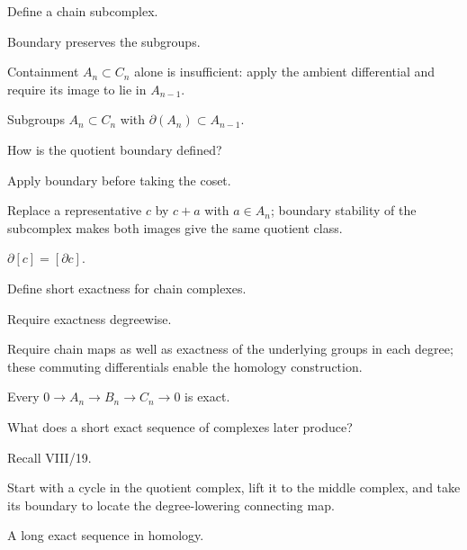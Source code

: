\begin{exercise}\label{exr:viii16-16}
Define a chain subcomplex.
\end{exercise}
\begin{hint}
Boundary preserves the subgroups.

Containment \(A_n\subset C_n\) alone is insufficient: apply the ambient differential and require its image to lie in \(A_{n-1}\).
\end{hint}
\begin{solution}
Subgroups \(A_n\subset C_n\) with \(\partial(A_n)\subset A_{n-1}\).
\end{solution}

\begin{exercise}\label{exr:viii16-17}
How is the quotient boundary defined?
\end{exercise}
\begin{hint}
Apply boundary before taking the coset.

Replace a representative \(c\) by \(c+a\) with \(a\in A_n\); boundary stability of the subcomplex makes both images give the same quotient class.
\end{hint}
\begin{solution}
\(\partial[c]=[\partial c]\).
\end{solution}

\begin{exercise}\label{exr:viii16-18}
Define short exactness for chain complexes.
\end{exercise}
\begin{hint}
Require exactness degreewise.

Require chain maps as well as exactness of the underlying groups in each degree; these commuting differentials enable the homology construction.
\end{hint}
\begin{solution}
Every \(0\to A_n\to B_n\to C_n\to0\) is exact.
\end{solution}

\begin{exercise}\label{exr:viii16-19}
What does a short exact sequence of complexes later produce?
\end{exercise}
\begin{hint}
Recall VIII/19.

Start with a cycle in the quotient complex, lift it to the middle complex, and take its boundary to locate the degree-lowering connecting map.
\end{hint}
\begin{solution}
A long exact sequence in homology.
\end{solution}

